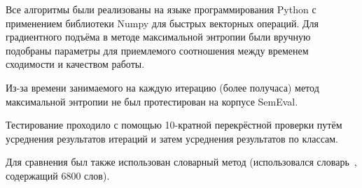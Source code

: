 Все алгоритмы были реализованы на языке программирования Python
с применением библиотеки Numpy для быстрых векторных операций.
Для градиентного подъёма в методе максимальной энтропии
были вручную подобраны параметры для приемлемого соотношения
между временем сходимости и качеством работы. 

Из-за времени занимаемого на каждую итерацию (более получаса) метод 
максимальной энтропии не был протестирован на корпусе SemEval. 

Тестирование проходило с помощью 10-кратной перекрёстной проверки
путём усреднения результатов итераций и затем усреднения результатов по 
классам.

Для сравнения был также использован словарный метод (использовался словарь~\cite{dictionary}, содержащий 6800 слов).